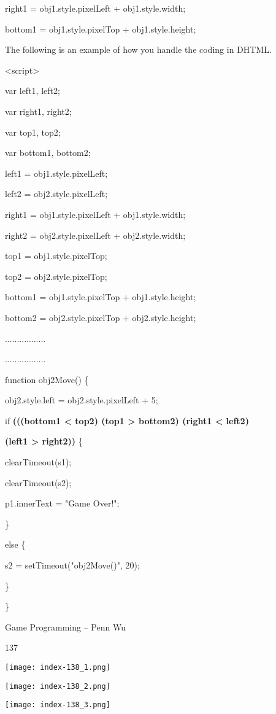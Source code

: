 \documentclass[
]{article}
\begin{document}
right1 = obj1.style.pixelLeft + obj1.style.width;

bottom1 = obj1.style.pixelTop + obj1.style.height;

The following is an example of how you handle the coding in DHTML.

\textless script\textgreater{}

var left1, left2;

var right1, right2;

var top1, top2;

var bottom1, bottom2;

left1 = obj1.style.pixelLeft;

left2 = obj2.style.pixelLeft;

right1 = obj1.style.pixelLeft + obj1.style.width;

right2 = obj2.style.pixelLeft + obj2.style.width;

top1 = obj1.style.pixelTop;

top2 = obj2.style.pixelTop;

bottom1 = obj1.style.pixelTop + obj1.style.height;

bottom2 = obj2.style.pixelTop + obj2.style.height;

.................

.................

function obj2Move() \{

obj2.style.left = obj2.style.pixelLeft + 5;

if \textbf{(((bottom1 \textless{} top2) \textbar\textbar{} (top1
\textgreater{} bottom2) \textbar\textbar{} (right1 \textless{} left2)}

\textbf{\textbar\textbar{} (left1 \textgreater{} right2))} \{

clearTimeout(s1);

clearTimeout(s2);

p1.innerText = "Game Over!";

\}

else \{

s2 = setTimeout("obj2Move()", 20);

\}

\}

Game Programming -- Penn Wu

137

\protect\hypertarget{index_split_009.htmlux5cux23p138}{}{}\texttt{[image: index-138\_1.png]}

\texttt{[image: index-138\_2.png]}

\texttt{[image: index-138\_3.png]}
\end{document}
